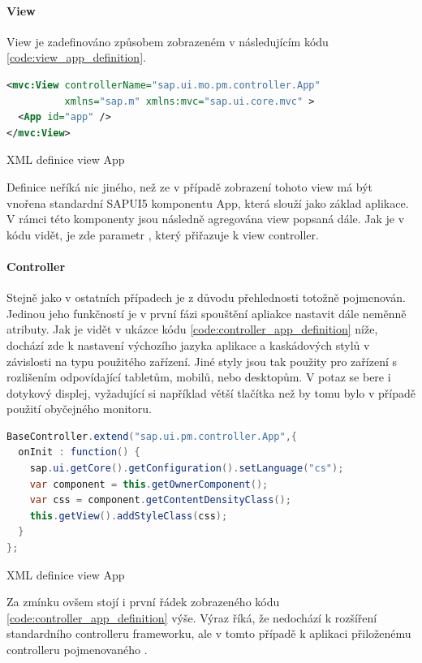 \documentclass[thesis=M,czech]{FITthesis}[2012/06/26]
\begin{document}
\paragraph{View} View je zadefinováno způsobem zobrazeném v následujícím kódu \ref{code:view_app_definition}.
\begin{algorithm}[H]
	\begin{lstlisting}[language=xml]      
<mvc:View controllerName="sap.ui.mo.pm.controller.App"
          xmlns="sap.m" xmlns:mvc="sap.ui.core.mvc" >
  <App id="app" />
</mvc:View>
	\end{lstlisting}
	\caption{XML definice view App}	
	\label{code:view_app_definition}
\end{algorithm}	
Definice neříká nic jiného, než ze v případě zobrazení tohoto view má být vnořena standardní SAPUI5 komponentu App, která slouží jako základ aplikace. V rámci této komponenty jsou následně agregována view popsaná dále. Jak je v kódu vidět, je zde parametr , který přiřazuje k view controller. 
\paragraph{Controller} Stejně jako v ostatních případech je z důvodu přehlednosti totožně pojmenován. Jedinou jeho funkčností je v první fázi spouštění apliakce nastavit dále neměnně atributy. Jak je vidět v ukázce kódu \ref{code:controller_app_definition} níže, dochází zde k nastavení výchozího jazyka aplikace a kaskádových stylů v závislosti na typu použitého zařízení. Jiné styly jsou tak použity pro zařízení s rozlišením odpovídající tabletům, mobilů, nebo desktopům. V potaz se bere i dotykový displej, vyžadující si například větší tlačítka než by tomu bylo v případě použití obyčejného monitoru.
\begin{algorithm}[H]
	\begin{lstlisting}[language=java]      
BaseController.extend("sap.ui.pm.controller.App",{
  onInit : function() {
    sap.ui.getCore().getConfiguration().setLanguage("cs");
    var component = this.getOwnerComponent();
    var css = component.getContentDensityClass();
    this.getView().addStyleClass(css);
  }
}; 
	\end{lstlisting}
	\caption{XML definice view App}	
	\label{code:controller_app_definition}
\end{algorithm}	
Za zmínku ovšem stojí i první řádek zobrazeného kódu \ref{code:controller_app_definition} výše. Výraz  říká, že nedochází k rozšíření standardního controlleru frameworku, ale v tomto případě k aplikaci přiloženému controlleru pojmenovaného .
\end{document}
